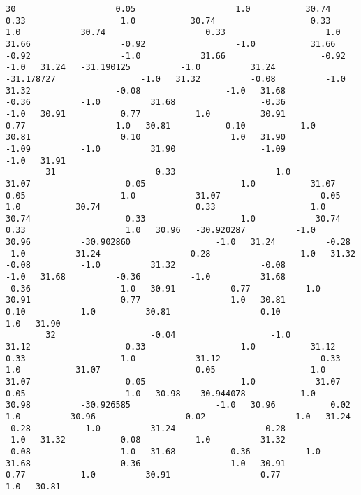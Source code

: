 \documentclass[11pt]{article}
\begin{document}
\begin{Verbatim}[commandchars=\\\{\}]
        30                    0.05                    1.0           30.74                   0.33                   1.0           30.74                   0.33                   1.0            30.74                    0.33                    1.0           31.66                  -0.92                  -1.0           31.66                  -0.92                  -1.0            31.66                   -0.92                   -1.0   31.24   -31.190125          -1.0          31.24          -31.178727                 -1.0   31.32          -0.08          -1.0          31.32                 -0.08                 -1.0   31.68          -0.36          -1.0          31.68                 -0.36                 -1.0   30.91           0.77           1.0          30.91                  0.77                  1.0   30.81           0.10           1.0          30.81                  0.10                  1.0   31.90          -1.09          -1.0          31.90                 -1.09                 -1.0   31.91   
        31                    0.33                    1.0           31.07                   0.05                   1.0           31.07                   0.05                   1.0            31.07                    0.05                    1.0           30.74                   0.33                   1.0           30.74                   0.33                   1.0            30.74                    0.33                    1.0   30.96   -30.920287          -1.0          30.96          -30.902860                 -1.0   31.24          -0.28          -1.0          31.24                 -0.28                 -1.0   31.32          -0.08          -1.0          31.32                 -0.08                 -1.0   31.68          -0.36          -1.0          31.68                 -0.36                 -1.0   30.91           0.77           1.0          30.91                  0.77                  1.0   30.81           0.10           1.0          30.81                  0.10                  1.0   31.90   
        32                   -0.04                   -1.0           31.12                   0.33                   1.0           31.12                   0.33                   1.0            31.12                    0.33                    1.0           31.07                   0.05                   1.0           31.07                   0.05                   1.0            31.07                    0.05                    1.0   30.98   -30.944078          -1.0          30.98          -30.926585                 -1.0   30.96           0.02           1.0          30.96                  0.02                  1.0   31.24          -0.28          -1.0          31.24                 -0.28                 -1.0   31.32          -0.08          -1.0          31.32                 -0.08                 -1.0   31.68          -0.36          -1.0          31.68                 -0.36                 -1.0   30.91           0.77           1.0          30.91                  0.77                  1.0   30.81   

\end{Verbatim}
\end{document}
